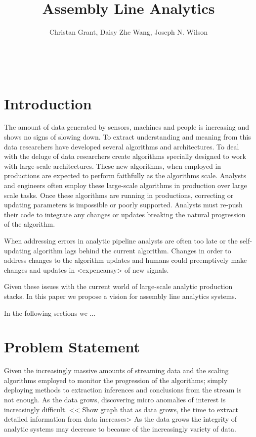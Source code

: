 \documentclass{sig-alternate}
\title{Assembly Line Analytics}
\author{Christan Grant, Daisy Zhe Wang, Joseph N. Wilson\\
\affaddr{Department of Computer \& Information Science \& Engineering}\\
\affaddr{E403 CSE Building}\\
\affaddr{Gainesville, Florida, 32612}\\
\email{\{cgrant,daisyw,jnw\}@cise.ufl.edu}
}
\begin{document}
\maketitle



\section{Introduction}

The amount of data generated by sensors, machines and people is increasing and shows no signs of slowing down.
To extract understanding and meaning from this data researchers have developed several algorithms and architectures.
To deal with the deluge of data researchers create algorithms specially designed to work with large-scale architectures.
These new algorithms, when employed in productions are expected to perform faithfully as the algorithms scale.
Analysts and engineers often employ these large-scale algorithms in production over large scale tasks.
Once these algorithms are running in productions, correcting or updating parameters is impossible or poorly supported.
Analysts must re-push their code to integrate any changes or updates breaking the natural progression of the algorithm.

When addressing errors in analytic pipeline analysts are often too late or the self-updating algorithm
lags behind the current algorithm.
Changes in order to address changes to the algorithm updates and humans could preemptively make changes and
 updates in <expencansy> of new signals.


Given these issues with the current world of large-scale analytic production stacks.
In this paper we propose a vision for assembly line analytics systems.

In the following sections we ...



\section{Problem Statement}

Given the increasingly massive amounts of streaming data and the scaling algorithms employed to monitor the progression of the algorithms; simply deploying methods to extraction inferences and conclusions from the stream is not enough.
As the data grows, discovering micro anomalies of interest is increasingly difficult.
<< Show graph that as data grows, the time to extract detailed information from data increases>
As the data grows the integrity of analytic systems may decrease to because of the increasingly variety of data.
\end{document}
